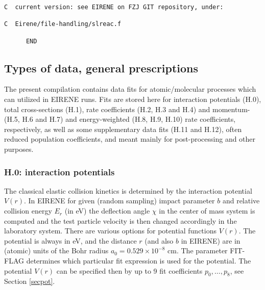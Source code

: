 \documentclass[12pt,dvipdfmx]{article}
\begin{document}
\begin{small}
\begin{verbatim}
C  current version: see EIRENE on FZJ GIT repository, under:

C  Eirene/file-handling/slreac.f

      END
\end{verbatim}\end{small}
\newpage

\subsection{Types of data, general prescriptions}\label{sec1.3}
The present compilation contains data fits for atomic/molecular processes which can utilized in EIRENE runs.
Fits are stored here for interaction potentials (H.0), total cross-sections (H.1),
rate coefficients (H.2, H.3 and H.4) and momentum- (H.5, H.6 and H.7) and
energy-weighted (H.8, H.9, H.10) rate coefficients, respectively, as well as some
supplementary data fits (H.11 and H.12), often reduced population coefficients,
and meant mainly for post-processing and other purposes.

\setcounter{subsubsection}{-1}
\subsubsection{H.0: interaction potentials}\label{sec1.3.0}
The classical elastic collision kinetics is determined by the
interaction potential $V(r)$. In EIRENE for given (random sampling)
impact parameter $b$ and relative collision energy $E_r$ (in eV) the
deflection angle $\chi$ in the center of mass system is computed and
the test particle velocity is then changed accordingly in the
laboratory system. There are various options for potential functions
$V(r)$. The potential is always in eV, and the distance $r$ (and
also $b$ in EIRENE) are in (atomic) units of the Bohr radius
$a_0=0.529 \times 10^{-8}$ cm. The parameter FIT-FLAG determines
which particular fit expression is used for the potential. The
potential $V(r)$ can be specified then by up
to 9 fit coefficients $p_0,\dots,p_8$, see Section \ref{secpot}.\\
\end{document}
